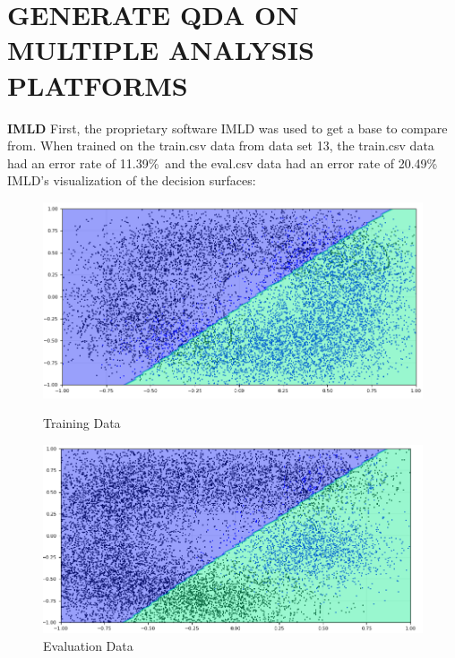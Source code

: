 \documentclass{article}
\begin{document}
\section{\MakeUppercase{Generate QDA on multiple analysis platforms}}
\begin{flushleft}
\textbf{IMLD}\break
\break
First, the proprietary software IMLD was used to get a base to compare from. When trained on the train.csv data from data set 13, the train.csv data had an error rate of 11.39\%\, and the eval.csv data had an error rate of 20.49\%\. \break
\break
IMLD's visualization of the decision surfaces:\break
\begin{figure}[!htb]
        \centering
        \begin{minipage}{0.49\textwidth}
                \centering
                \includegraphics[width=1\linewidth]{../IMLDTrain.png}
                \caption{Training Data}
        \end{minipage}
        \begin{minipage}{0.49\textwidth}
                \centering
                \includegraphics[width=1\linewidth]{../IMLDEval.png}
                \caption{Evaluation Data}
        \end{minipage}
\end{figure}

\end{flushleft}
\end{document}

